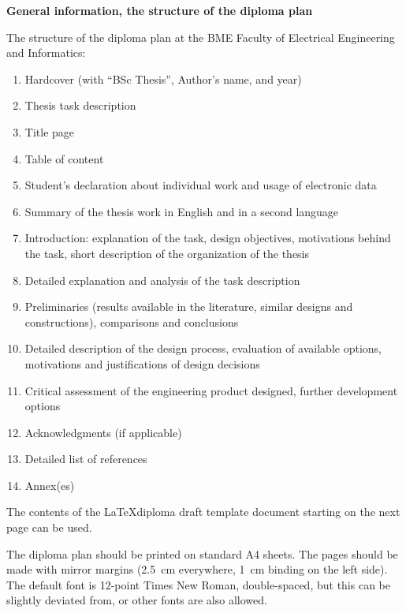 
\footnotesize
\begin{center}
\large
\textbf{\Large General information, the structure of the diploma plan}\\
\end{center}

The structure of the diploma plan at the BME Faculty of Electrical Engineering and Informatics:
\begin{enumerate}
\item Hardcover (with “BSc Thesis”, Author’s name, and year)
\item Thesis task description
\item Title page
\item Table of content
\item Student’s declaration about individual work and usage of electronic data 
\item Summary of the thesis work in English and in a second language
\item Introduction: explanation of the task, design objectives, motivations behind the task, short description of the organization of the thesis 
\item Detailed explanation and analysis of the task description
\item Preliminaries (results available in the literature, similar designs and constructions), comparisons and conclusions
\item Detailed description of the design process, evaluation of available options, motivations and justifications of design decisions
\item Critical assessment of the engineering product designed, further development options  
\item Acknowledgments (if applicable)
\item Detailed list of references
\item Annex(es)

\end{enumerate}

The contents of the \LaTeX diploma draft template document starting on the next page can be used.

The diploma plan should be printed on standard A4 sheets. The pages should be made with mirror margins (2.5~cm everywhere, 1~cm binding on the left side). The default font is 12-point Times New Roman, double-spaced, but this can be slightly deviated from, or other fonts are also allowed.

